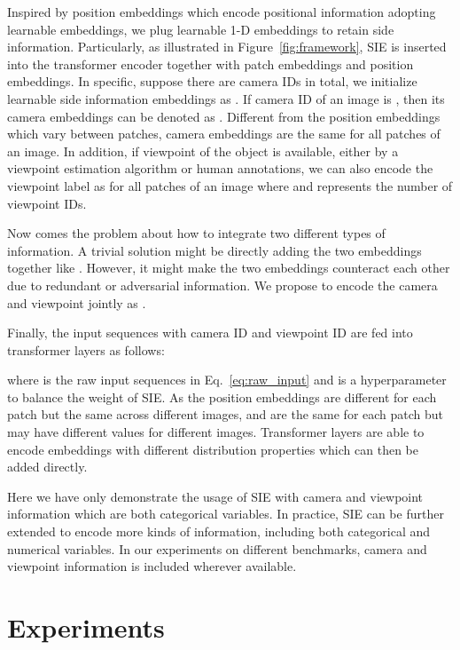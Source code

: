 \documentclass[10pt,twocolumn,letterpaper]{article}
\begin{document}
Inspired by position embeddings which encode positional information adopting learnable embeddings, we plug learnable 1-D embeddings to retain side information. Particularly, as illustrated in Figure~\ref{fig:framework}, SIE is inserted into the transformer encoder together with patch embeddings and position embeddings.  
In specific, suppose there are  camera IDs in total, we initialize learnable side information embeddings as . If camera ID of an image is , then its camera embeddings can be denoted as . Different from the position embeddings which vary between patches, camera embeddings  are the same for all patches of an image. In addition, if viewpoint of the object is available, either by a viewpoint estimation algorithm or human annotations, we can also encode the viewpoint label  as  for all patches of an image where  and  represents the number of viewpoint IDs.

Now comes the problem about how to integrate two different types of information. A trivial solution might be directly adding the two embeddings together like . 
However, it might make the two embeddings counteract each other due to redundant or adversarial information. We propose to encode the camera and viewpoint jointly as  . 

Finally, the input sequences with camera ID  and viewpoint ID  are fed into transformer layers as follows:

\vspace{-0.5em}

where  is the raw input sequences in Eq.~\ref{eq:raw_input} and  is a hyperparameter to balance the weight of SIE. As the position embeddings are different for each patch but the same across different images, and  are the same for each patch but may have different values for different images. Transformer layers are able to encode embeddings with different distribution properties which can then be added directly.

Here we have only demonstrate the usage of SIE with camera and viewpoint information which are both categorical variables. In practice, SIE can be further extended to encode more kinds of information, including both categorical and numerical variables. In our experiments on different benchmarks, camera and viewpoint information is included wherever available.

 

\section{Experiments}
\end{document}
